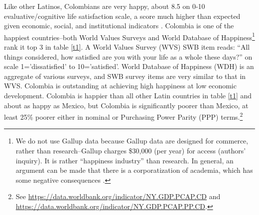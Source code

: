 \documentclass[10pt, letterpaper]{article}
\begin{document}
\begin{spacing}{2}
Like other Latinos, Colombians are very happy, about 8.5
on 0-10  evaluative/cognitive life satisfaction scale, a score much higher than expected given
economic, social, and institutional indicators \citep{PNUD}. 
Colombia is %
one of  the happiest countries--both World Values Surveys and
World Database of Happiness\footnote{We do not
  use Gallup data because Gallup data are designed for commerce, rather than research--Gallup charges \$30,000 (per year) for  access
  (authors' inquiry). It is rather ``happiness industry'' \citep{davies15} than research.
In general, an argument can be made that there is a corporatization of academia,
which has some negative consequences \citep{mills2012corporatization,cox2013corporatization,millsNYT12fa,CatropaNYT20feb8,schmidlinNYT15oct10}.
} rank it top 3 in table \ref{t1}.
 A World Values Survey (WVS) SWB item reads: ``All things considered, how
satisfied are you with your life as a whole these days?'' on scale
1='dissatisfied' to 10='satisfied'. World Database of Happiness (WDH) is an
aggregate of various surveys, and SWB survey items are very similar to that in WVS. 
 Colombia is outstanding at achieving  high happiness at low economic development. 
 Colombia is happier than all other Latin countries in table \ref{t1} and about
as happy as Mexico, but Colombia is significantly poorer than Mexico, at least
25\% poorer either in nominal or Purchasing Power Parity (PPP) terms.\footnote{See 
  \url{https://data.worldbank.org/indicator/NY.GDP.PCAP.CD}
  and
  \url{https://data.worldbank.org/indicator/NY.GDP.PCAP.PP.CD}.
%
}                                 
 


\end{spacing}
\end{document}
